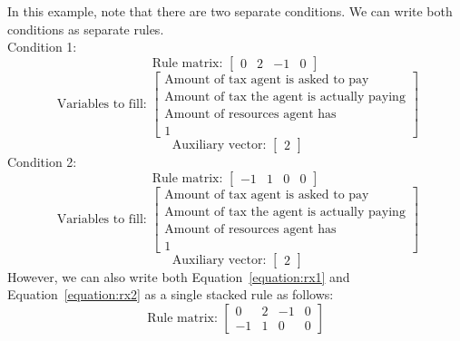 In this example, note that there are two separate conditions. We can write both conditions as separate rules.
\\ Condition 1:
\begin{equation}
    \textrm{Rule matrix: }
    \begin{bmatrix}
        0 & 2 & -1 & 0
    \end{bmatrix}
    \label{equation:rx1}
\end{equation}
\begin{equation}
    \textrm{   Variables to fill:  }
    \begin{bmatrix}
        \textrm{Amount of tax agent is asked to pay} \\
        \textrm{Amount of tax the agent is actually paying} \\
        \textrm{Amount of resources agent has} \\
        1
    \end{bmatrix}     
\end{equation}
\[
    \textrm{   Auxiliary vector: } 
    \begin{bmatrix}
        2 
    \end{bmatrix}   
\]
Condition 2:
\begin{equation}
    \textrm{Rule matrix: }
    \begin{bmatrix}
        -1 & 1 & 0 & 0
    \end{bmatrix}
    \label{equation:rx2}
\end{equation}
\begin{equation}
\textrm{   Variables to fill:  }
    \begin{bmatrix}
        \textrm{Amount of tax agent is asked to pay} \\
        \textrm{Amount of tax the agent is actually paying} \\
        \textrm{Amount of resources agent has} \\
        1
    \end{bmatrix}     
\end{equation}
\begin{equation}
    \textrm{   Auxiliary vector: } 
    \begin{bmatrix}
        2 
    \end{bmatrix}   
\end{equation}
However, we can also write both Equation~\eqref{equation:rx1} and Equation~\eqref{equation:rx2} as a single stacked rule as follows:
\begin{equation}
    \textrm{Rule matrix: }
    \begin{bmatrix}
        0 & 2 & -1 & 0 \\
        -1 & 1 & 0 & 0 
    \end{bmatrix}
\end{equation}
